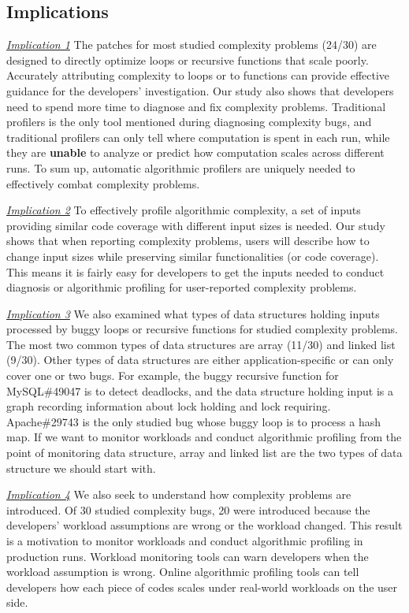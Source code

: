 {{\subsection{Implications}
\label{sec:study_impli}

{\underline{\textit{Implication 1}}
The patches for most studied complexity problems (24/30)
are designed to directly optimize loops or recursive functions that scale poorly.
Accurately attributing complexity to loops or to functions can provide 
effective guidance for the developers' investigation. 
Our study also shows that developers need to spend more time to 
diagnose and fix complexity problems.
Traditional profilers is the only tool mentioned during diagnosing complexity bugs, 
and traditional profilers can only tell where computation is spent in each run, 
while they are {\bf unable} to analyze or predict how computation scales across different runs.
To sum up, automatic algorithmic profilers are uniquely needed to effectively combat complexity problems.  

{\underline{\textit{Implication 2}}
To effectively profile algorithmic complexity,
a set of inputs providing similar code coverage with different input sizes is needed. 
Our study shows that when reporting complexity problems,
users will describe how to change input sizes 
while preserving similar functionalities (or code coverage). 
This means it is fairly easy for developers to get the inputs needed 
to conduct diagnosis or algorithmic profiling for user-reported complexity problems. 

{\underline{\textit{Implication 3}}}
We also examined what types of data structures holding inputs processed 
by buggy loops or recursive functions for studied complexity problems.
The most two common types of data structures 
are array (11/30) and linked list (9/30).
Other types of data structures are either application-specific or 
can only cover one or two bugs.
For example, the buggy recursive function for MySQL\#49047 is to detect deadlocks,
and the data structure holding input is a graph recording information about lock holding and lock requiring. 
Apache\#29743 is the only studied bug whose buggy loop is to process a hash map. 
If we want to monitor workloads and conduct algorithmic profiling from the point of monitoring data structure, 
array and linked list are the two types of data structure we should start with.

{\underline{\textit{Implication 4}}
We also seek to understand how complexity problems are introduced. 
Of 30 studied complexity bugs, 20 were introduced 
because the developers' workload assumptions are wrong or the workload changed. 
This result is a motivation to monitor workloads and conduct algorithmic profiling in production runs. 
Workload monitoring tools can warn developers when the workload assumption is wrong.
Online algorithmic profiling tools can tell developers 
how each piece of codes scales under real-world workloads on the user side.  

}}}}}
